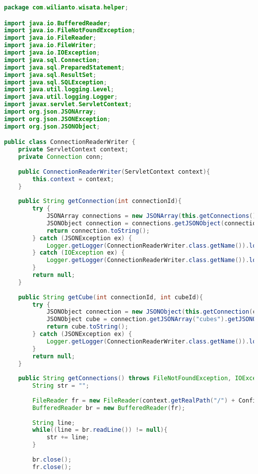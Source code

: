 \begin{lstlisting}[language=Java,basicstyle=\tiny,caption=ConnectionReaderWriter.java]
package com.wilianto.wisata.helper;

import java.io.BufferedReader;
import java.io.FileNotFoundException;
import java.io.FileReader;
import java.io.FileWriter;
import java.io.IOException;
import java.sql.Connection;
import java.sql.PreparedStatement;
import java.sql.ResultSet;
import java.sql.SQLException;
import java.util.logging.Level;
import java.util.logging.Logger;
import javax.servlet.ServletContext;
import org.json.JSONArray;
import org.json.JSONException;
import org.json.JSONObject;

public class ConnectionReaderWriter {
    private ServletContext context;
    private Connection conn;
    
    public ConnectionReaderWriter(ServletContext context){
        this.context = context;
    }
        
    public String getConnection(int connectionId){
        try {
            JSONArray connections = new JSONArray(this.getConnections());
            JSONObject connection = connections.getJSONObject(connectionId);
            return connection.toString();
        } catch (JSONException ex) {
            Logger.getLogger(ConnectionReaderWriter.class.getName()).log(Level.SEVERE, null, ex);
        } catch (IOException ex) {
            Logger.getLogger(ConnectionReaderWriter.class.getName()).log(Level.SEVERE, null, ex);
        }
        return null;
    }
    
    public String getCube(int connectionId, int cubeId){
        try {
            JSONObject connection = new JSONObject(this.getConnection(connectionId));
            JSONObject cube = connection.getJSONArray("cubes").getJSONObject(cubeId);
            return cube.toString();
        } catch (JSONException ex) {
            Logger.getLogger(ConnectionReaderWriter.class.getName()).log(Level.SEVERE, null, ex);
        } 
        return null;
    }
    
    public String getConnections() throws FileNotFoundException, IOException{
        String str = "";
        
        FileReader fr = new FileReader(context.getRealPath("/") + Config.connectionFile);
        BufferedReader br = new BufferedReader(fr);
        
        String line;
        while((line = br.readLine()) != null){
            str += line;
        }
        
        br.close();
        fr.close();
        

\end{lstlisting}
